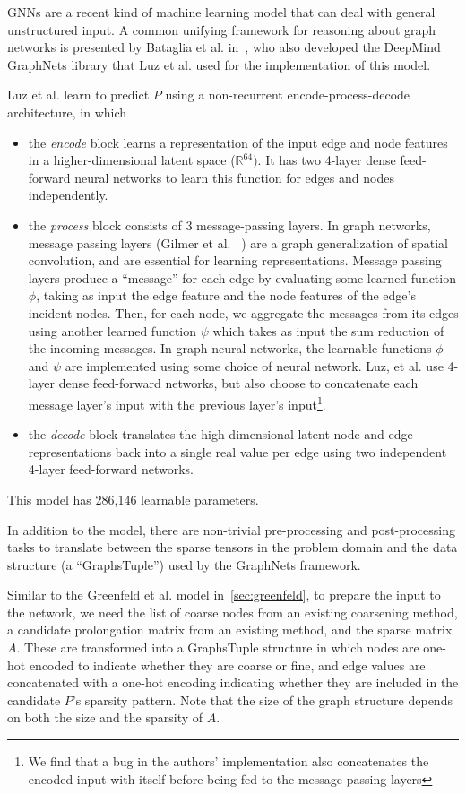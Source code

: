 \documentclass{svproc}
\newcommand{\etal}{et al. }
\begin{document}
GNNs are a recent kind of machine learning model that can deal with general unstructured input. A common unifying framework for reasoning about graph networks is presented by Bataglia \etal in~\cite{battaglia2018relational}, who also developed the DeepMind GraphNets library that Luz \etal used for the implementation of this model.

Luz \etal learn to predict $P$ using a non-recurrent encode-process-decode architecture, in which
\begin{itemize}
    \item the \textit{encode} block learns a representation of the input edge and node features in a higher-dimensional latent space ($\mathbb{R}^{64})$. It has two 4-layer dense feed-forward neural networks to learn this function for edges and nodes independently.
    \item the \textit{process} block consists of 3 message-passing layers. In graph networks, message passing layers (Gilmer \etal~\cite{gilmer2017neural}) are a graph generalization of spatial convolution, and are essential for learning representations. Message passing layers produce a ``message'' for each edge by evaluating some learned function $\phi$, taking as input the edge feature and the node features of the edge's incident nodes. Then, for each node, we aggregate the messages from its edges using another learned function $\psi$ which takes as input the sum reduction of the incoming messages. In graph neural networks, the learnable functions $\phi$ and $\psi$ are implemented using some choice of neural network. Luz, \etal use 4-layer dense feed-forward networks, but also choose to concatenate each message layer's input with the previous layer's input\footnote{We find that a bug in the authors' implementation also concatenates the encoded input with itself before being fed to the message passing layers}.
    \item the \textit{decode} block translates the high-dimensional latent node and edge representations back into a single real value per edge using two independent 4-layer feed-forward networks.
\end{itemize}

This model has 286,146 learnable parameters.

In addition to the model, there are non-trivial pre-processing and post-processing tasks to translate between the sparse tensors in the problem domain and the data structure (a ``GraphsTuple'') used by the GraphNets framework. 

Similar to the Greenfeld \etal model in~\ref{sec:greenfeld}, to prepare the input to the network, we need the list of coarse nodes from an existing coarsening method, a candidate prolongation matrix from an existing method, and the sparse matrix $A$. These are transformed into a GraphsTuple structure in which nodes are one-hot encoded to indicate whether they are coarse or fine, and edge values are concatenated with a one-hot encoding indicating whether they are included in the candidate $P$'s sparsity pattern. Note that the size of the graph structure depends on both the size and the sparsity of $A$.
\end{document}
